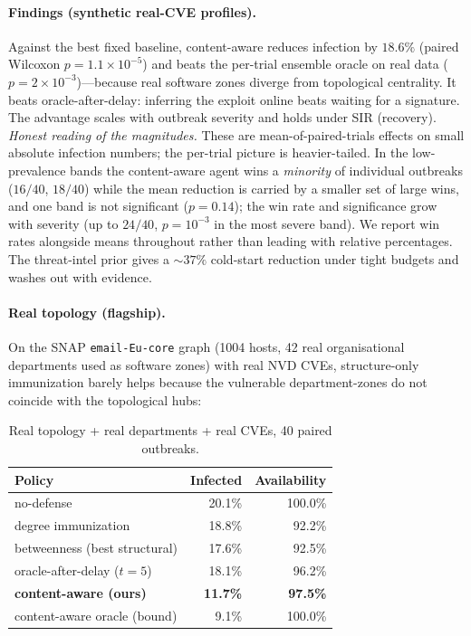 \documentclass[11pt]{article}
\begin{document}
\paragraph{Findings (synthetic real-CVE profiles).} Against the best fixed
baseline, content-aware reduces infection by $18.6\%$ (paired Wilcoxon
$p=1.1\times10^{-5}$) and beats the per-trial ensemble oracle on real data
($p=2\times10^{-3}$)---because real software zones diverge from topological
centrality. It beats oracle-after-delay: inferring the exploit online beats
waiting for a signature. The advantage scales with outbreak severity and holds
under SIR (recovery). \emph{Honest reading of the magnitudes.} These are
mean-of-paired-trials effects on small absolute infection numbers; the per-trial
picture is heavier-tailed. In the low-prevalence bands the content-aware agent
wins a \emph{minority} of individual outbreaks ($16/40$, $18/40$) while the mean
reduction is carried by a smaller set of large wins, and one band is not
significant ($p=0.14$); the win rate and significance grow with severity (up to
$24/40$, $p=10^{-3}$ in the most severe band). We report win rates alongside means
throughout rather than leading with relative percentages. The threat-intel prior
gives a $\sim37\%$ cold-start reduction under tight budgets and washes out with
evidence.

\paragraph{Real topology (flagship).} On the SNAP \texttt{email-Eu-core} graph
(1004 hosts, 42 real organisational departments used as software zones) with real
NVD CVEs, structure-only immunization barely helps because the vulnerable
department-zones do not coincide with the topological hubs:

\begin{table}[t]\centering
\caption{Real topology + real departments + real CVEs, 40 paired outbreaks.}
\begin{tabular}{lrr}
\toprule
Policy & Infected & Availability \\
\midrule
no-defense & 20.1\% & 100.0\% \\
degree immunization & 18.8\% & 92.2\% \\
betweenness (best structural) & 17.6\% & 92.5\% \\
oracle-after-delay ($t{=}5$) & 18.1\% & 96.2\% \\
\textbf{content-aware (ours)} & \textbf{11.7\%} & \textbf{97.5\%} \\
content-aware oracle (bound) & 9.1\% & 100.0\% \\
\bottomrule
\end{tabular}
\end{table}
\end{document}

